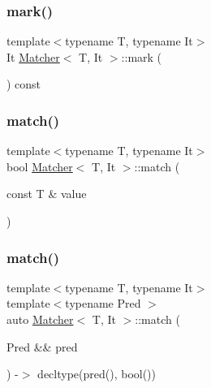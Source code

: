 \mbox{\label{class_matcher_af9135752ac195a21c230267d52db6623}} 
\subsubsection{\texorpdfstring{mark()}{mark()}}
{\footnotesize\ttfamily template$<$typename T, typename It$>$ \\
It \hyperlink{class_matcher}{Matcher}$<$ T, It $>$\+::mark (\begin{DoxyParamCaption}{ }\end{DoxyParamCaption}) const\hspace{0.3cm}{\ttfamily [inline]}}

\mbox{\label{class_matcher_ad10d558fa9248baf4490d50ad395a55e}} 
\subsubsection{\texorpdfstring{match()}{match()}\hspace{0.1cm}{\footnotesize\ttfamily [1/6]}}
{\footnotesize\ttfamily template$<$typename T, typename It$>$ \\
bool \hyperlink{class_matcher}{Matcher}$<$ T, It $>$\+::match (\begin{DoxyParamCaption}\item[{const T \&}]{value }\end{DoxyParamCaption})\hspace{0.3cm}{\ttfamily [inline]}}

\mbox{\label{class_matcher_a1f088e17e646f4e53a9d0297b4bd4d8b}} 
\subsubsection{\texorpdfstring{match()}{match()}\hspace{0.1cm}{\footnotesize\ttfamily [2/6]}}
{\footnotesize\ttfamily template$<$typename T, typename It$>$ \\
template$<$typename Pred $>$ \\
auto \hyperlink{class_matcher}{Matcher}$<$ T, It $>$\+::match (\begin{DoxyParamCaption}\item[{Pred \&\&}]{pred }\end{DoxyParamCaption}) -\/$>$ decltype(pred(), bool())
  \hspace{0.3cm}{\ttfamily [inline]}}

